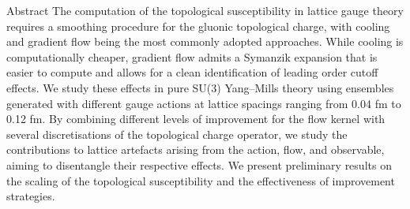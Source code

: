 \begin{block}{Abstract}
    The computation of the topological susceptibility in 
    lattice gauge theory requires a smoothing procedure for 
    the gluonic topological charge, with cooling and gradient 
    flow being the most commonly adopted approaches. While 
    cooling is computationally cheaper, gradient flow admits 
    a Symanzik expansion that is easier to compute and allows 
    for a clean identification of leading order cutoff effects.
    We study these effects in pure SU(3) Yang--Mills theory using 
    ensembles generated with different gauge actions at lattice 
    spacings ranging from 0.04 fm to 0.12 fm. By combining different 
    levels of improvement for the flow kernel with several discretisations 
    of the topological charge operator, we study the contributions 
    to lattice artefacts arising from the action, flow, and observable,
    aiming to disentangle their respective effects. We present 
    preliminary results on the scaling of the topological susceptibility
    and the effectiveness of improvement strategies.
\end{block}